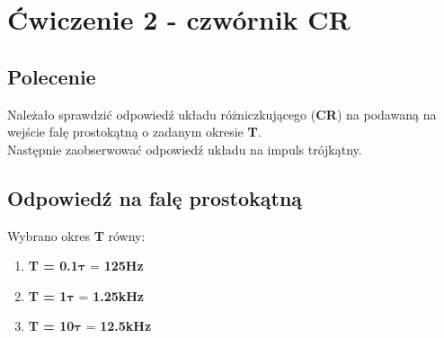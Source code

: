 \chapter{Ćwiczenie 2 - czwórnik CR}

\section{Polecenie}

Należało sprawdzić odpowiedź układu różniczkującego (\textbf{CR}) na podawaną na wejście falę prostokątną o zadanym okresie \textbf{T}. \\ 
Następnie zaobserwować odpowiedź układu na impuls trójkątny. 

\section{Odpowiedź na falę prostokątną}

Wybrano okres \textbf{T} równy:
\begin{enumerate}
    \label{poprawa:dodanie_wartosci_tau_3_2}
    \item \textbf{T = 0.1}$\boldsymbol{\tau}$ = \textbf{125Hz}
    \item \textbf{T = 1}$\boldsymbol{\tau}$ = \textbf{1.25kHz}
    \item \textbf{T = 10}$\boldsymbol{\tau}$ = \textbf{12.5kHz}
\end{enumerate}

